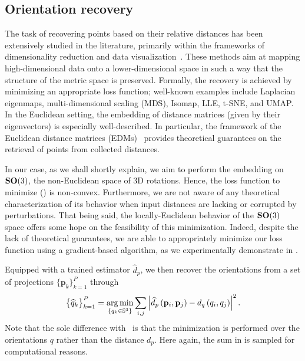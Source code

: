 \subsection{Orientation recovery}\label{sec:method:orientation-recovery}

The task of recovering points based on their relative distances has been extensively studied in the literature, primarily within the frameworks of dimensionality reduction and data visualization~\cite{belkin2003laplacian,kruskal1978multidimensional, maaten2008visualizing, mcinnes2018umap,dokmanic2015euclidean}.
These methods aim at mapping high-dimensional data onto a lower-dimensional space in such a way that the structure of the metric space is preserved.
Formally, the recovery is achieved by minimizing an appropriate loss function; well-known examples include Laplacian eigenmaps, multi-dimensional scaling (MDS), Isomap, LLE, t-SNE, and UMAP.
In the Euclidean setting, the embedding of distance matrices (given by their eigenvectors) is especially well-described.
In particular, the framework of the Euclidean distance matrices (EDMs)~\cite{dokmanic2015euclidean} provides theoretical guarantees on the retrieval of points from collected distances.

In our case, as we shall shortly explain, we aim to perform the embedding on $\mathrm{\mathbf{SO}}(3)$, the non-Euclidean space of 3D rotations. Hence, the loss function to minimize () is non-convex. Furthermore, we are not aware of any theoretical characterization of its behavior when input distances are lacking or corrupted by perturbations. That being said, the locally-Euclidean behavior of the $\mathrm{\mathbf{SO}}(3)$ space offers some hope on the feasibility of this minimization.
Indeed, despite the lack of theoretical guarantees, we are able to appropriately minimize our loss function using a gradient-based algorithm, as we experimentally demonstrate in .

Equipped with a trained estimator $\widehat{d}_p$, we then recover the orientations from a set of projections $\big\{ \mathbf{p}_k \big\}_{k=1}^P$ through
\begin{equation}
    \big\{ \widehat{q}_k \big\}_{k=1}^P = \operatorname*{arg\,min}_{\{q_k \in \mathbb{S}^3\}} \sum_{i,j} \left| \widehat{d}_p \left( \mathbf{p}_i, \mathbf{p}_j \right) - d_q\left(q_i,q_j\right) \right|^2.
    \label{eqn:orientation-recovery}
\end{equation}
Note that the sole difference with~ is that the minimization is performed over the orientations $q$ rather than the distance $d_p$.
Here again, the sum in  is sampled for computational reasons.

